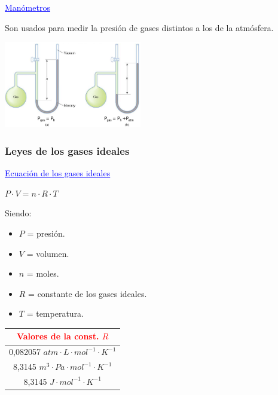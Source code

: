             \begin{center} \textcolor{blue}{\underline{Manómetros}} \end{center}
                \sangria{} Son usados para medir la presión de gases distintos a los de la atmósfera.
                \begin{center} \includegraphics[width=6cm]{./imagenes/manometros.png} \end{center}
        \subsubsection{Leyes de los gases ideales}
            \begin{center} \textcolor{blue}{\underline{Ecuación de los gases ideales}} \end{center} 
            \begin{center}
                $P \cdot V = n \cdot R \cdot T$
            \end{center}
            \sangria{} Siendo:
            \begin{itemize}
                \item $P$ = presión.
                \item $V$ = volumen.
                \item $n$ = moles.
                \item $R$ = constante de los gases ideales.
                \item $T$ = temperatura.
            \end{itemize}
            \begin{center}
                \begin{tabular}{| c |}
                    \hline
                    \textcolor{red}{\textbf{Valores de la const. $R$}} \\
                    \hline
                    0,082057 $atm \cdot L \cdot {mol^{-1}} \cdot {K^{-1}}$ \\
                    \hline
                    8,3145 $m^3 \cdot Pa \cdot {mol^{-1}} \cdot {K^{-1}}$ \\
                    \hline
                    8,3145 $J \cdot {mol^{-1}} \cdot {K^{-1}}$ \\
                    \hline
                \end{tabular}
            \end{center}
